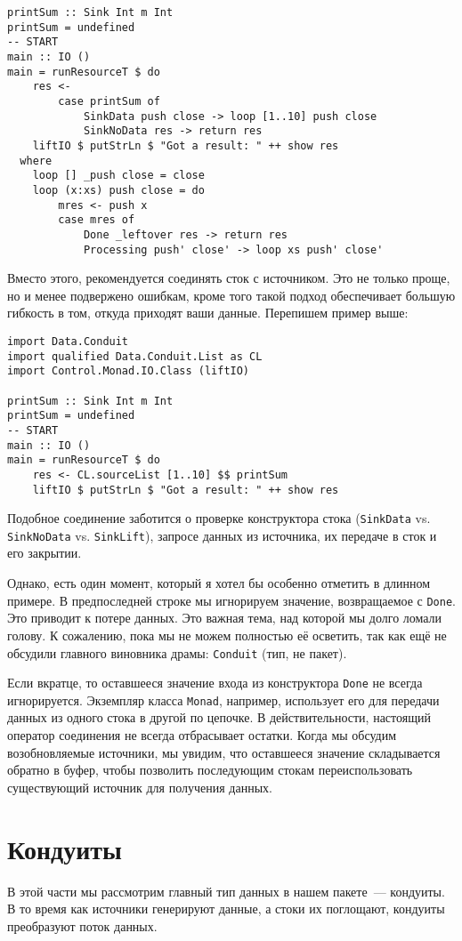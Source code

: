 {\begin{lstlisting}
printSum :: Sink Int m Int
printSum = undefined
-- START
main :: IO ()
main = runResourceT $ do
    res <-
        case printSum of
            SinkData push close -> loop [1..10] push close
            SinkNoData res -> return res
    liftIO $ putStrLn $ "Got a result: " ++ show res
  where
    loop [] _push close = close
    loop (x:xs) push close = do
        mres <- push x
        case mres of
            Done _leftover res -> return res
            Processing push' close' -> loop xs push' close'
\end{lstlisting}
Вместо этого, рекомендуется соединять сток с источником. Это не только проще, 
но и менее подвержено ошибкам, кроме того такой подход обеспечивает большую гибкость в том, откуда приходят ваши данные.
Перепишем пример выше:
\begin{lstlisting}
import Data.Conduit
import qualified Data.Conduit.List as CL
import Control.Monad.IO.Class (liftIO)

printSum :: Sink Int m Int
printSum = undefined
-- START
main :: IO ()
main = runResourceT $ do
    res <- CL.sourceList [1..10] $$ printSum
    liftIO $ putStrLn $ "Got a result: " ++ show res
\end{lstlisting}

Подобное соединение заботится о проверке конструктора стока (\lstinline'SinkData' vs. 
\lstinline'SinkNoData' vs. \lstinline'SinkLift'), запросе данных из источника, их передаче
в сток и его закрытии.

Однако, есть один момент, который я хотел бы особенно отметить в длинном примере. В предпоследней строке
мы игнорируем значение, возвращаемое с \lstinline'Done'. Это приводит
к потере данных. Это важная тема, над которой мы долго ломали голову. К сожалению,
пока мы не можем полностью её осветить, так как ещё не обсудили главного виновника
драмы: \lstinline'Conduit' (тип, не пакет). 

Если вкратце, то оставшееся значение входа из конструктора \lstinline{Done} не всегда игнорируется. Экземпляр класса \lstinline{Monad},
например, использует его для передачи данных из одного стока в другой по цепочке.
В действительности, настоящий оператор соединения не всегда отбрасывает остатки. Когда мы
обсудим возобновляемые источники, мы
увидим, что оставшееся значение складывается обратно в буфер, чтобы позволить последующим
стокам переиспользовать существующий источник для получения данных.

\section{Кондуиты}
В этой части мы рассмотрим главный тип данных в нашем пакете~--- кондуиты. В то время как
источники генерируют данные, а стоки их поглощают, кондуиты преобразуют поток данных.

}
